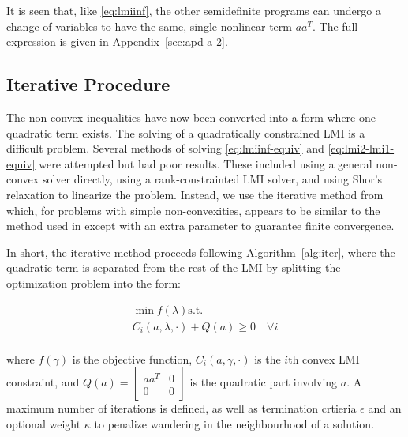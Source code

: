 It is seen that, like \autoref{eq:lmiinf}, the other semidefinite programs can undergo a change of variables to have the same, single nonlinear term $aa^T$. The full expression is given in Appendix~\ref{sec:apd-a-2}.

\subsection{Iterative Procedure}

The non-convex inequalities have now been converted into a form where one quadratic term exists. The solving of a quadratically constrained \gls{LMI} is a difficult problem. Several methods of solving \autoref{eq:lmiinf-equiv} and \autoref{eq:lmi2-lmi1-equiv} were attempted but had poor results. These included using a general non-convex solver directly, using a rank-constrainted LMI solver, and using Shor's relaxation to linearize the problem. Instead, we use the iterative method from \cite{Shishkin2017} which, for problems with simple non-convexities, appears to be similar to the method used in \cite{Li2014} except with an extra parameter to guarantee finite convergence. 

In short, the iterative method proceeds following Algorithm~\ref{alg:iter}, where the quadratic term is separated from the rest of the \gls{LMI} by splitting the optimization problem into the form:

\begin{equation} \label{eq:opt-prb}
	\begin{gathered}
		\min f(\lambda) \mathrm{ s.t.} \\
		C_i(a, \lambda, \cdot) + Q(a) \geq 0 \quad \forall i \\	
	\end{gathered}
\end{equation}

where $f(\gamma)$ is the objective function, $C_i(a, \gamma, \cdot)$ is the $i$th convex \gls{LMI} constraint, and $Q(a)=\begin{bmatrix} aa^T & 0 \\ 0 & 0 \end{bmatrix}$ is the quadratic part involving $a$. A maximum number of iterations  is defined, as well as termination crtieria $\epsilon$ and an optional weight $\kappa$ to penalize wandering in the neighbourhood of a solution.

